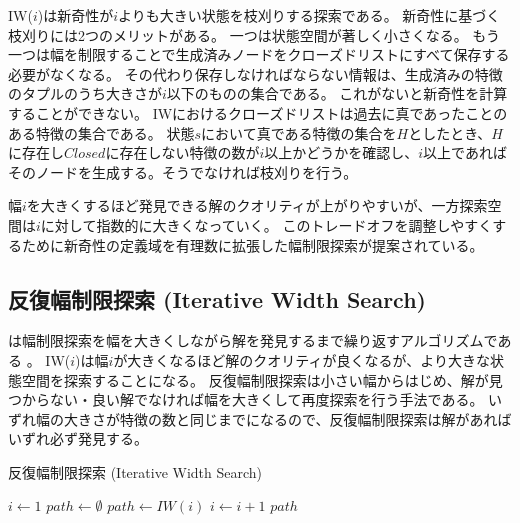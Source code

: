 IW($i$)は新奇性が$i$よりも大きい状態を枝刈りする探索である。
新奇性に基づく枝刈りには2つのメリットがある。
一つは状態空間が著しく小さくなる。
もう一つは幅を制限することで生成済みノードをクローズドリストにすべて保存する必要がなくなる。
その代わり保存しなければならない情報は、生成済みの特徴のタプルのうち大きさが$i$以下のものの集合である。
これがないと新奇性を計算することができない。
IWにおけるクローズドリストは過去に真であったことのある特徴の集合である。
状態$s$において真である特徴の集合を$H$としたとき、$H$に存在し$Closed$に存在しない特徴の数が$i$以上かどうかを確認し、$i$以上であればそのノードを生成する。そうでなければ枝刈りを行う。

幅$i$を大きくするほど発見できる解のクオリティが上がりやすいが、一方探索空間は$i$に対して指数的に大きくなっていく。
このトレードオフを調整しやすくするために新奇性の定義域を有理数に拡張した幅制限探索が提案されている\cite{geffner2015}。


\subsection{反復幅制限探索 (Iterative Width Search)}
\label{sec:iterative-width-search}

は幅制限探索を幅を大きくしながら解を発見するまで繰り返すアルゴリズムである \cite{lipovetzkyg12}。
IW($i$)は幅$i$が大きくなるほど解のクオリティが良くなるが、より大きな状態空間を探索することになる。
反復幅制限探索は小さい幅からはじめ、解が見つからない・良い解でなければ幅を大きくして再度探索を行う手法である。
いずれ幅の大きさが特徴の数と同じまでになるので、反復幅制限探索は解があればいずれ必ず発見する。

\begin{algorithm}
\caption{反復幅制限探索 (Iterative Width Search)}
$i \leftarrow 1$\;
$path \leftarrow \emptyset$\;
	 {
		$path \leftarrow IW(i)$\;
		$i \leftarrow i + 1$\;
	}
	\Return $path$
\end{algorithm}

